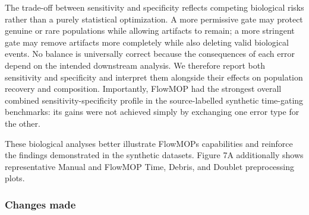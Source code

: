 \documentclass[
  11pt,
  a4paper,
]{article}
\begin{document}
The trade-off between sensitivity and specificity reflects competing
biological risks rather than a purely statistical optimization. A more
permissive gate may protect genuine or rare populations while allowing
artifacts to remain; a more stringent gate may remove artifacts more
completely while also deleting valid biological events. No balance is
universally correct because the consequences of each error depend on the
intended downstream analysis. We therefore report both sensitivity and
specificity and interpret them alongside their effects on population
recovery and composition. Importantly, FlowMOP had the strongest overall
combined sensitivity-specificity profile in the source-labelled
synthetic time-gating benchmarks: its gains were not achieved simply by
exchanging one error type for the other.

These biological analyses better illustrate FlowMOP\textquotesingle s
capabilities and reinforce the findings demonstrated in the synthetic
datasets. Figure 7A additionally shows representative Manual and FlowMOP
Time, Debris, and Doublet preprocessing plots.

\subsubsection{Changes made}\label{changes-made-2}
\end{document}
